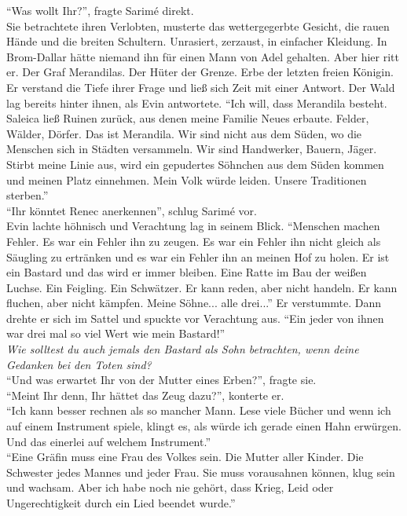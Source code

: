 ``Was wollt Ihr?'', fragte Sarimé direkt.\\
Sie betrachtete ihren Verlobten, musterte das wettergegerbte Gesicht, die rauen Hände und die 
breiten Schultern. Unrasiert, zerzaust, in einfacher Kleidung. In Brom-Dallar hätte niemand ihn für 
einen Mann von Adel gehalten. Aber hier ritt er. Der Graf Merandilas. Der Hüter der Grenze. Erbe 
der letzten freien Königin.\\
Er verstand die Tiefe ihrer Frage und ließ sich Zeit mit einer Antwort. Der Wald lag bereits hinter 
ihnen, als Evin antwortete. ``Ich will, dass Merandila besteht. Saleica ließ Ruinen zurück, aus 
denen meine Familie Neues erbaute. Felder, Wälder, Dörfer. Das ist Merandila. Wir sind nicht aus 
dem Süden, wo die Menschen sich in Städten versammeln. Wir sind Handwerker, Bauern, Jäger. Stirbt 
meine Linie aus, wird ein gepudertes Söhnchen aus dem Süden kommen und meinen Platz einnehmen. Mein 
Volk würde leiden. Unsere Traditionen sterben.''\\
``Ihr könntet Renec anerkennen'', schlug Sarimé vor.\\
Evin lachte höhnisch und Verachtung lag in seinem Blick. ``Menschen machen Fehler. Es war ein 
Fehler ihn zu zeugen. Es war ein Fehler ihn nicht gleich als Säugling zu ertränken und es war ein 
Fehler ihn an meinen Hof zu holen. Er ist ein Bastard und das wird er immer bleiben. Eine Ratte im 
Bau der weißen Luchse. Ein Feigling. Ein Schwätzer. Er kann reden, aber nicht handeln. Er kann 
fluchen, aber nicht kämpfen. Meine Söhne... alle drei...'' Er verstummte. Dann drehte er sich im 
Sattel und spuckte vor Verachtung aus. ``Ein jeder von ihnen war drei mal so viel Wert wie mein 
Bastard!''\\
\textit{Wie solltest du auch jemals den Bastard als Sohn betrachten, wenn deine Gedanken bei den 
Toten sind?}\\
``Und was erwartet Ihr von der Mutter eines Erben?'', fragte sie.\\
``Meint Ihr denn, Ihr hättet das Zeug dazu?'', konterte er.\\
``Ich kann besser rechnen als so mancher Mann. Lese viele Bücher und wenn ich auf einem Instrument 
spiele, klingt es, als würde ich gerade einen Hahn erwürgen. Und das einerlei auf welchem 
Instrument.''\\
``Eine Gräfin muss eine Frau des Volkes sein. Die Mutter aller Kinder. Die Schwester jedes Mannes 
und jeder Frau. Sie muss vorausahnen können, klug sein und wachsam. Aber ich habe noch nie gehört, 
dass Krieg, Leid oder Ungerechtigkeit durch ein Lied beendet wurde.''\\
